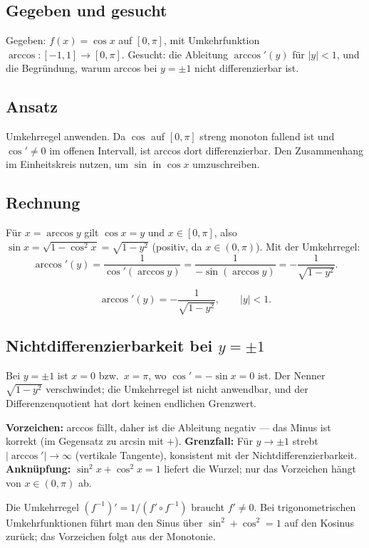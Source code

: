 
\subsection*{Gegeben und gesucht}
Gegeben: $f(x)=\cos x$ auf $[0,\pi]$, mit Umkehrfunktion
$\arccos:[-1,1]\to[0,\pi]$. Gesucht: die Ableitung $\arccos'(y)$ für
$|y|<1$, und die Begründung, warum arccos bei $y=\pm1$ nicht differenzierbar
ist.

\subsection*{Ansatz}
Umkehrregel anwenden. Da $\cos$ auf $[0,\pi]$ streng monoton fallend ist und
$\cos'\neq0$ im offenen Intervall, ist arccos dort differenzierbar. Den
Zusammenhang im Einheitskreis nutzen, um $\sin$ in $\cos x$ umzuschreiben.

\subsection*{Rechnung}
Für $x=\arccos y$ gilt $\cos x=y$ und $x\in[0,\pi]$, also
$\sin x=\sqrt{1-\cos^2 x}=\sqrt{1-y^2}$ (positiv, da $x\in(0,\pi)$). Mit der
Umkehrregel:
\begin{equation}
  \arccos'(y)=\frac{1}{\cos'(\arccos y)}
  =\frac{1}{-\sin(\arccos y)}
  =-\frac{1}{\sqrt{1-y^2}}.
\end{equation}
\begin{ergebnis}
\begin{equation*}
  \arccos'(y)=-\frac{1}{\sqrt{1-y^2}},
  \qquad |y|<1.
\end{equation*}
\end{ergebnis}

\subsection*{Nichtdifferenzierbarkeit bei $y=\pm1$}
Bei $y=\pm1$ ist $x=0$ bzw.\ $x=\pi$, wo $\cos'=-\sin x=0$ ist. Der Nenner
$\sqrt{1-y^2}$ verschwindet; die Umkehrregel ist nicht anwendbar, und der
Differenzenquotient hat dort keinen endlichen Grenzwert.

\begin{kontrolle}
\textbf{Vorzeichen:} arccos fällt, daher ist die Ableitung negativ — das Minus
ist korrekt (im Gegensatz zu arcsin mit $+$).
\textbf{Grenzfall:} Für $y\to\pm1$ strebt $|\arccos'|\to\infty$
(vertikale Tangente), konsistent mit der Nichtdifferenzierbarkeit.
\textbf{Anknüpfung:} $\sin^2 x+\cos^2 x=1$ liefert die Wurzel; nur das
Vorzeichen hängt von $x\in(0,\pi)$ ab.
\end{kontrolle}

\begin{merksatz}
Die Umkehrregel $(f^{-1})'=1/(f'\circ f^{-1})$ braucht $f'\neq0$. Bei
trigonometrischen Umkehrfunktionen führt man den Sinus über
$\sin^2+\cos^2=1$ auf den Kosinus zurück; das Vorzeichen folgt aus der
Monotonie.
\end{merksatz}
